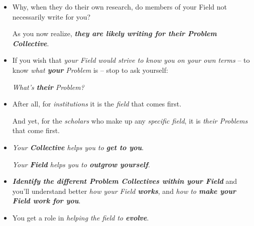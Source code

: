 \documentclass[11pt]{article}
\begin{document}
\begin{itemize}
\item Why, when they do their own research, do members of your Field not necessarily write for you? 

As you now realize, \emph{\textbf{they are likely writing for their Problem Collective}}. 

\item If you wish that \emph{your Field would strive to know you on your own terms} -- to know \emph{what \textbf{your} Problem} is -- stop to ask yourself:

\emph{What’s \textbf{their} Problem?}

\item After all, for \emph{institutions} it is the \emph{field} that comes first. 

And yet, for the \emph{scholars} who make up any \emph{specific field}, it is \emph{their Problems} that come first. 

\item \emph{Your \textbf{Collective} helps you to \textbf{get to you}}.

\emph{Your \textbf{Field} helps you to \textbf{outgrow yourself}}.

\item \emph{\textbf{Identify the different Problem Collectives within your Field}} and you’ll understand better \emph{how your Field \textbf{works}}, and \emph{how to \textbf{make your Field work for you}}. 

\item You get a role in \emph{helping the field to \textbf{evolve}}.
\end{itemize}
\end{document}
